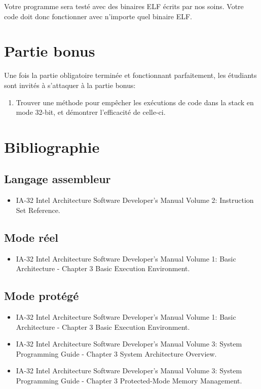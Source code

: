 \documentclass[10pt,a4wide]{article}
\begin{document}
Votre programme sera test\'e avec des binaires ELF \'ecrits par nos soins.
Votre code doit donc fonctionner avec n'importe quel binaire ELF.

\section{Partie bonus}

Une fois la partie obligatoire termin\'ee et fonctionnant parfaitement, les
\'etudiants sont invit\'es \`a s'attaquer \`a la partie bonus:

\begin{enumerate}
\item Trouver une m\'ethode pour emp\^echer les ex\'ecutions de code dans
      la stack en mode 32-bit, et d\'emontrer l'efficacit\'e de celle-ci.
\end{enumerate}

\section{Bibliographie}

\subsection{Langage assembleur}

\begin{itemize}
\item IA-32 Intel Architecture Software Developer's Manual Volume 2: 
      Instruction Set Reference.
\end{itemize}

\subsection{Mode r\'eel}

\begin{itemize}
\item IA-32 Intel Architecture Software Developer's Manual Volume 1:
      Basic Architecture - Chapter 3 Basic Execution Environment.
\end{itemize}

\subsection{Mode prot\'eg\'e}

\begin{itemize}
\item IA-32 Intel Architecture Software Developer's Manual Volume 1:
      Basic Architecture - Chapter 3 Basic Execution Environment.
\item IA-32 Intel Architecture Software Developer's Manual Volume 3:
      System Programming Guide - Chapter 3 System Architecture Overview.
\item IA-32 Intel Architecture Software Developer's Manual Volume 3:
      System Programming Guide - Chapter 3 Protected-Mode Memory Management.
\end{itemize}
\end{document}
